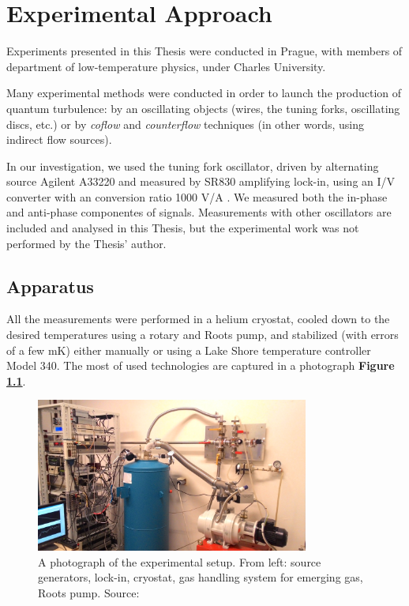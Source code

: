 \chapter{Experimental Approach}

Experiments presented in this Thesis were conducted in Prague, with members of department of low-temperature physics, under Charles University.

Many experimental methods were conducted in order to launch the production of quantum turbulence: by an oscillating objects (wires, the tuning forks, oscillating discs, etc.) or by \textit{coflow} and \textit{counterflow} techniques (in other words, using indirect flow sources).

In our investigation, we used the tuning fork oscillator, driven by alternating source Agilent A33220 and measured by SR830 amplifying lock-in, using an I/V converter with an conversion ratio 1000 V/A \cite{skyba}. We measured both the in-phase and anti-phase componentes of signals. Measurements with other oscillators are included and analysed in this Thesis, but the experimental work was not performed by the Thesis' author.

\section{Apparatus}

All the measurements were performed in a helium cryostat, cooled down to the desired temperatures using a rotary and Roots pump, and stabilized (with errors of a few mK) either manually or using a Lake Shore temperature controller Model 340. The most of used technologies are captured in a photograph \textbf{Figure \ref{cryostat}}.

\begin{figure}[h]
	\centering
	\includegraphics[width=0.8\textwidth]{graphics/exp/apparatus}
	\caption{A photograph of the experimental setup. From left: source generators, lock-in, cryostat, gas handling system for emerging gas, Roots pump. Source: \cite{bakalaris}}
	\label{cryostat}
\end{figure}

